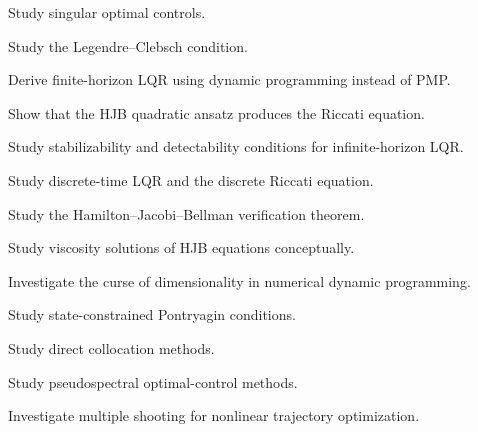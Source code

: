 \begin{exercise}[4]
Study singular optimal controls.
\end{exercise}

\begin{exercise}[4]
Study the Legendre--Clebsch condition.
\end{exercise}

\begin{exercise}[4]
Derive finite-horizon LQR using dynamic programming instead of PMP.
\end{exercise}

\begin{exercise}[4]
Show that the HJB quadratic ansatz produces the Riccati equation.
\end{exercise}

\begin{exercise}[4]
Study stabilizability and detectability conditions for infinite-horizon
LQR.
\end{exercise}

\begin{exercise}[4]
Study discrete-time LQR and the discrete Riccati equation.
\end{exercise}

\begin{exercise}[4]
Study the Hamilton--Jacobi--Bellman verification theorem.
\end{exercise}

\begin{exercise}[4]
Study viscosity solutions of HJB equations conceptually.
\end{exercise}

\begin{exercise}[4]
Investigate the curse of dimensionality in numerical dynamic programming.
\end{exercise}

\begin{exercise}[4]
Study state-constrained Pontryagin conditions.
\end{exercise}

\begin{exercise}[4]
Study direct collocation methods.
\end{exercise}

\begin{exercise}[4]
Study pseudospectral optimal-control methods.
\end{exercise}

\begin{exercise}[4]
Investigate multiple shooting for nonlinear trajectory optimization.
\end{exercise}

